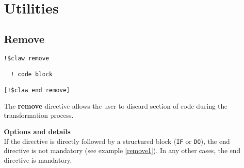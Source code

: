 \section{Utilities}

\subsection{Remove}
\begin{lstlisting}
!$claw remove

  ! code block
  
[!$claw end remove]
\end{lstlisting}

The \textbf{remove} directive allows the user to discard section of code
during the transformation process. 

\textbf{Options and details}\\
If the directive is directly followed by a structured block (\lstinline!IF! or \lstinline!DO!), the
end directive is not mandatory (see example \ref{remove1}). In any other cases, the end
directive is mandatory.